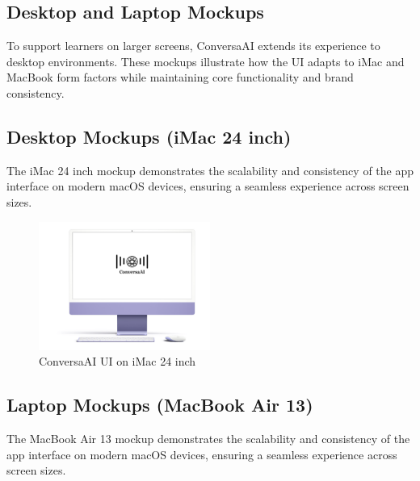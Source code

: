 \documentclass[12pt]{article}
\begin{document}
\subsection*{Desktop and Laptop Mockups}

To support learners on larger screens, ConversaAI extends its experience to desktop environments. These mockups illustrate how the UI adapts to iMac and MacBook form factors while maintaining core functionality and brand consistency.


\subsection*{Desktop Mockups (iMac 24 inch)}

The iMac 24 inch mockup demonstrates the scalability and consistency of the app interface on modern macOS devices, ensuring a seamless experience across screen sizes.

\begin{figure}[h!]
    \centering
    \includegraphics[width=0.5\textwidth]{iMac_24_inch.png} %
    \caption{ConversaAI UI on iMac 24 inch}
    \label{fig:iMac_ui}
\end{figure}

\subsection*{Laptop Mockups (MacBook Air 13)}

The MacBook Air 13 mockup demonstrates the scalability and consistency of the app interface on modern macOS devices, ensuring a seamless experience across screen sizes.
\end{document}
